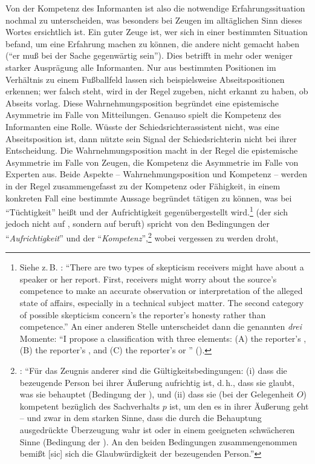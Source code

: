 Von der Kompetenz des Informanten ist also die notwendige Erfahrungssituation
nochmal zu unterscheiden, was besonders bei Zeugen im alltäglichen Sinn
dieses Wortes ersichtlich ist. Ein guter Zeuge ist, wer sich in einer
bestimmten Situation befand, um eine Erfahrung machen zu können, die andere
nicht gemacht haben (\enquote{er muß bei der Sache gegenwärtig sein}). Dies
betrifft in mehr oder weniger starker Ausprägung alle Informanten. Nur aus
bestimmten Positionen im Verhältnis zu einem Fußballfeld lassen sich
beispielsweise Abseitspositionen erkennen; wer falsch steht, wird in der Regel
zugeben, nicht erkannt zu haben, ob Abseits vorlag. Diese Wahrnehmungsposition
begründet eine epistemische Asymmetrie im Falle von Mitteilungen. Genauso
spielt die Kompetenz des Informanten eine Rolle. Wüsste der
Schiedsrichterassistent nicht, was eine Abseitsposition ist, dann nützte sein
Signal der Schiedsrichterin nicht bei ihrer Entscheidung. Die
Wahrnehmungsposition macht in der Regel die epistemische Asymmetrie im Falle von
Zeugen, die Kompetenz die Asymmetrie im Falle von Experten aus. Beide
Aspekte -- Wahrnehmungsposition und Kompetenz -- werden in der Regel
zusammengefasst zu der Kompetenz oder Fähigkeit, in einem konkreten Fall eine
bestimmte Aussage begründet tätigen zu können, was bei
 \enquote{Tüchtigkeit} heißt und der
Aufrichtigkeit gegenübergestellt wird.\footnote{Siehe z.\,B.
\cite[][108]{Goldman:KnowledgeinaSocialWorld1999}: \enquote{There are two types
of skepticism receivers might have about a speaker or her report. First,
receivers might worry about the source's competence to make an accurate
observation or interpretation of the alleged state of affairs, especially in a
technical subject matter. {\punkt} The second category of
possible skepticism concern's the reporter's honesty rather than competence.} An
einer anderen Stelle unterscheidet  dann die genannten
\emph{drei} Momente: \enquote{I propose a {\punkt} classification with three elements: (A)
the reporter’s , (B) the reporter’s , and (C)
the reporter’s  or }
(\cite[][123]{Goldman:KnowledgeinaSocialWorld1999}).}
 (der sich jedoch nicht auf
, sondern auf  beruft)
spricht von den Bedingungen der \enquote{\emph{Aufrichtigkeit}} und der
\enquote{\emph{Kompetenz}},\footnote{\cite[Vgl.][361]{Scholz:DasZeugnisanderer2001}:
\enquote{Für das Zeugnis anderer sind die Gültigkeitsbedingungen: (i) dass die bezeugende
Person bei ihrer Äußerung aufrichtig ist, d.\,h., dass sie glaubt, was sie
behauptet (Bedingung der ), und (ii) dass sie (bei der
Gelegenheit $O$) kompetent bezüglich des Sachverhalts $p$ ist, um den es in
ihrer Äußerung geht -- und zwar in dem starken Sinne, dass die durch die
Behauptung ausgedrückte Überzeugung wahr ist oder in einem geeigneten schwächeren Sinne (Bedingung der
). An den beiden Bedingungen zusammengenommen bemißt [sic] sich
die Glaubwürdigkeit der bezeugenden Person.}} wobei vergessen zu werden droht,
